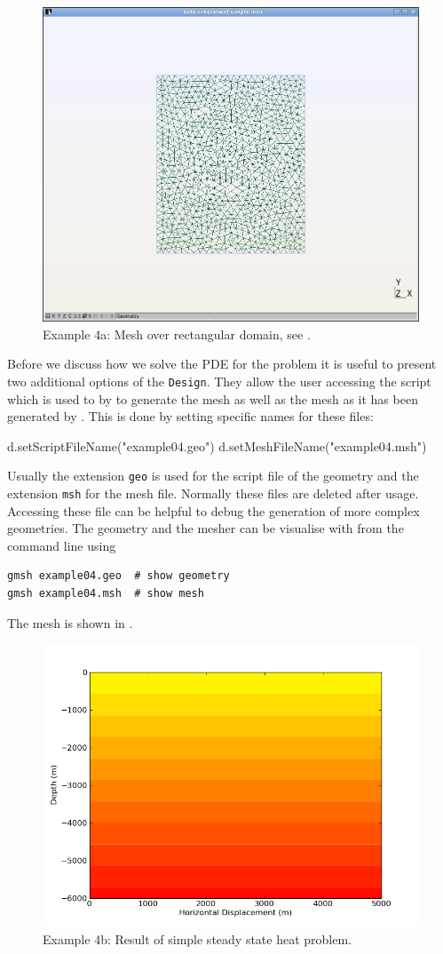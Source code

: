 \begin{figure}[ht]
\centerline{\includegraphics[width=4.in]{figures/simplemesh}}
\caption{Example 4a: Mesh over rectangular domain, see .}
\label{fig:pycad rec mesh}
\end{figure}

Before we discuss how we solve the PDE for the 
problem it is useful to present two additional options of the \verb|Design|. 
They allow the user accessing the script which is used to by \gmsh to generate the mesh as well as
the mesh as it has been generated by \gmsh. This is done by setting specific names for these files: 
\begin{python}
d.setScriptFileName("example04.geo")
d.setMeshFileName("example04.msh")
\end{python}
Usually the extension \texttt{geo} is used for the script file of the \gmsh geometry and
the extension \texttt{msh} for the mesh file. Normally these files are deleted after usage. 
Accessing these file can be helpful to debug the generation of more complex geometries. The geometry and the mesher can be visualise with \gmsh from the command line using
\begin{verbatim}
gmsh example04.geo  # show geometry
gmsh example04.msh  # show mesh
\end{verbatim}
The mesh is shown in .
\begin{figure}[ht]
\centerline{\includegraphics[width=4.in]{figures/simpleheat}}
\caption{Example 4b: Result of simple steady state heat problem.}
\label{fig:steady state heat}
\end{figure}


